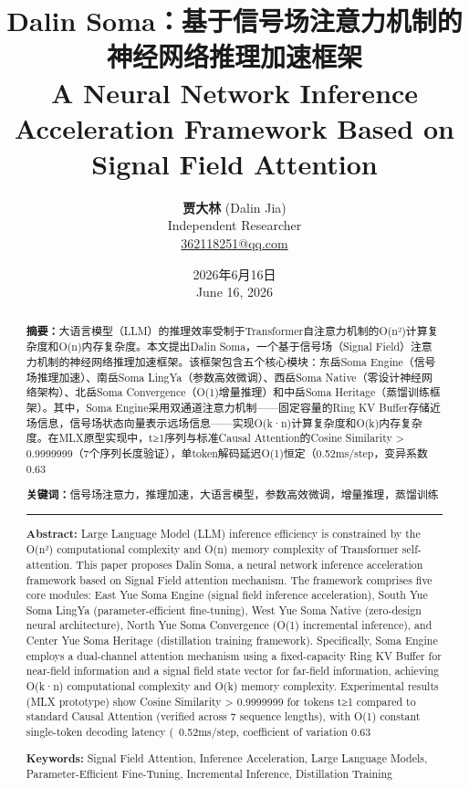 \documentclass[12pt, a4paper]{article}
\title{Dalin Soma：基于信号场注意力机制的神经网络推理加速框架\\[1em]
\Large A Neural Network Inference Acceleration Framework Based on Signal Field Attention}
\author{
    \textbf{贾大林} (Dalin Jia)\\
    \small Independent Researcher\\
    \small \href{mailto:362118251@qq.com}{362118251@qq.com}
}
\date{2026年6月16日 \\ \small June 16, 2026}
\begin{document}
\maketitle

\begin{abstract}
\noindent
\textbf{摘要：}大语言模型（LLM）的推理效率受制于Transformer自注意力机制的O(n²)计算复杂度和O(n)内存复杂度。本文提出Dalin Soma，一个基于信号场（Signal Field）注意力机制的神经网络推理加速框架。该框架包含五个核心模块：东岳Soma Engine（信号场推理加速）、南岳Soma LingYa（参数高效微调）、西岳Soma Native（零设计神经网络架构）、北岳Soma Convergence（O(1)增量推理）和中岳Soma Heritage（蒸馏训练框架）。其中，Soma Engine采用双通道注意力机制——固定容量的Ring KV Buffer存储近场信息，信号场状态向量表示远场信息——实现O(k·n)计算复杂度和O(k)内存复杂度。在MLX原型实现中，t≥1序列与标准Causal Attention的Cosine Similarity > 0.9999999（7个序列长度验证），单token解码延迟O(1)恒定（0.52ms/step，变异系数0.63%

\vspace{1em}
\noindent
\textbf{关键词：}信号场注意力，推理加速，大语言模型，参数高效微调，增量推理，蒸馏训练

\begin{center}
\rule{0.9\textwidth}{0.4pt}
\end{center}

\noindent
\textbf{Abstract:} Large Language Model (LLM) inference efficiency is constrained by the O(n²) computational complexity and O(n) memory complexity of Transformer self-attention. This paper proposes Dalin Soma, a neural network inference acceleration framework based on Signal Field attention mechanism. The framework comprises five core modules: East Yue Soma Engine (signal field inference acceleration), South Yue Soma LingYa (parameter-efficient fine-tuning), West Yue Soma Native (zero-design neural architecture), North Yue Soma Convergence (O(1) incremental inference), and Center Yue Soma Heritage (distillation training framework). Specifically, Soma Engine employs a dual-channel attention mechanism using a fixed-capacity Ring KV Buffer for near-field information and a signal field state vector for far-field information, achieving O(k·n) computational complexity and O(k) memory complexity. Experimental results (MLX prototype) show Cosine Similarity > 0.9999999 for tokens t≥1 compared to standard Causal Attention (verified across 7 sequence lengths), with O(1) constant single-token decoding latency (~0.52ms/step, coefficient of variation 0.63%

\vspace{1em}
\noindent
\textbf{Keywords:} Signal Field Attention, Inference Acceleration, Large Language Models, Parameter-Efficient Fine-Tuning, Incremental Inference, Distillation Training
\end{abstract}
\end{document}
